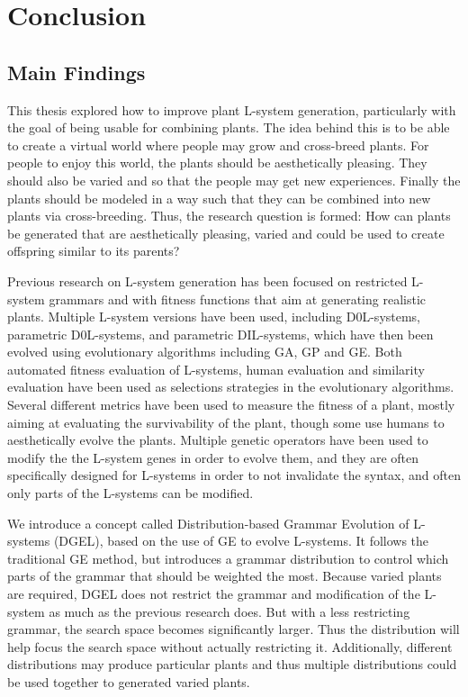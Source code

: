 \chapter{Conclusion}

\section{Main Findings}
This thesis explored how to improve plant L-system generation, particularly with the goal of being usable for combining plants.
The idea behind this is to be able to create a virtual world where people may grow and cross-breed plants.
For people to enjoy this world, the plants should be aesthetically pleasing.
They should also be varied and so that the people may get new experiences.
Finally the plants should be modeled in a way such that they can be combined into new plants via cross-breeding.
Thus, the research question is formed: How can plants be generated that are aesthetically pleasing, varied and could be used to create offspring similar to its parents?

Previous research on L-system generation has been focused on restricted L-system grammars and with fitness functions that aim at generating realistic plants.
Multiple L-system versions have been used, including D0L-systems, parametric D0L-systems, and parametric DIL-systems, which have then been evolved using evolutionary algorithms including GA, GP and GE.
Both automated fitness evaluation of L-systems, human evaluation and similarity evaluation have been used as selections strategies in the evolutionary algorithms.
Several different metrics have been used to measure the fitness of a plant, mostly aiming at evaluating the survivability of the plant, though some use humans to aesthetically evolve the plants.
Multiple genetic operators have been used to modify the the L-system genes in order to evolve them, and they are often specifically designed for L-systems in order to not invalidate the syntax, and often only parts of the L-systems can be modified.

We introduce a concept called Distribution-based Grammar Evolution of L-systems (DGEL), based on the use of GE to evolve L-systems. %
It follows the traditional GE method, %
but introduces a grammar distribution to control which parts of the grammar that should be weighted the most.
Because varied plants are required, DGEL does not restrict the grammar and modification of the L-system as much as the previous research does.
But with a less restricting grammar, the search space becomes significantly larger.
Thus the distribution will help focus the search space without actually restricting it.
Additionally, different distributions may produce particular plants and thus multiple distributions could be used together to generated varied plants.

